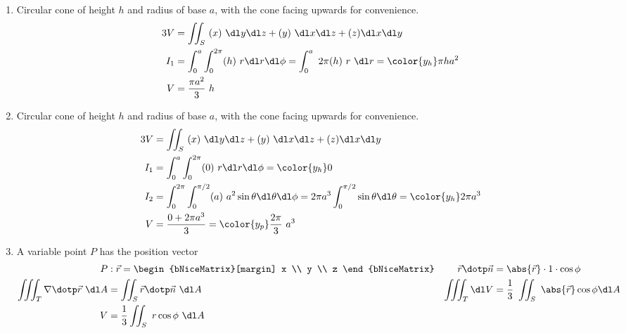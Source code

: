\begin{enumerate}
    \item Circular cone of height $ h $ and radius of base $ a $, with the cone facing
          upwards for convenience.
          \begin{align}
              3V  & = \iint_S\ (x)\ \dl y \dl z + (y)\ \dl x \dl z + (z) \dl x \dl y \\
              I_1 & = \int_{0}^{a}\int_{0}^{2\pi}
              (h)\ r \dl r \dl \phi
              = \int_{0}^{a}\ 2\pi(h)\ r\ \dl r = \color{y_h} \pi h a^2              \\
              V   & = \frac{\pi a^2}{3}\ h
          \end{align}

    \item Circular cone of height $ h $ and radius of base $ a $, with the cone facing
          upwards for convenience.
          \begin{align}
              3V  & = \iint_S\ (x)\ \dl y \dl z + (y)\ \dl x \dl z + (z) \dl x \dl y \\
              I_1 & = \int_{0}^{a}\int_{0}^{2\pi}
              (0)\ r \dl r \dl \phi = \color{y_h} 0                                  \\
              I_2 & = \int_{0}^{2\pi} \int_{0}^{\pi/2} (a)\ a^2 \sin \theta
              \dl \theta \dl \phi = 2\pi a^3 \int_{0}^{\pi/2} \sin \theta \dl \theta
              = \color{y_h} 2\pi a^3                                                 \\
              V   & = \frac{0 + 2 \pi a^3}{3} = \color{y_p} \frac{2\pi}{3}\ a^3
          \end{align}

    \item A variable point $ P $ has the position vector
          \begin{align}
              P                     & : \vec{r} = \begin{bNiceMatrix}[margin]
                                                      x \\ y \\ z
                                                  \end{bNiceMatrix}   &
              \vec{r} \dotp \vec{n} & = \abs{\vec{r}} \cdot 1 \cdot \cos \phi     \\
              \iiint_T \nabla \dotp \vec{r}\ \dl A
                                    & = \iint_S \vec{r} \dotp \vec{n}\ \dl A    &
              \iiint_T \dl V        & = \frac{1}{3}\ \iint_S\ \abs{\vec{r}}
              \cos \phi \dl A                                                     \\
              V                     & = \frac{1}{3} \iint_S\ r \cos \phi\ \dl A
          \end{align}


\end{enumerate}
